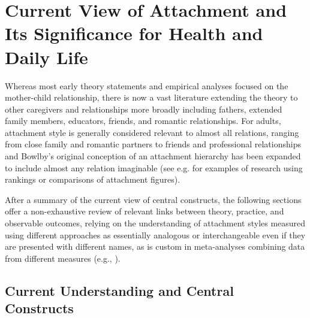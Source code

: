 \documentclass[12pt]{report}
\begin{document}
\section{Current View of Attachment and Its Significance for Health and Daily Life}
Whereas most early theory statements and empirical analyses focused on the mother-child relationship, there is now a vast literature extending the theory to other caregivers and relationships more broadly including fathers, extended family members, educators, friends, and romantic relationships. For adults, attachment style is generally considered relevant to almost all relations, ranging from close family and romantic partners to friends and professional relationships and Bowlby's original conception of an attachment hierarchy \cite{Bowlby1969attachment} has been expanded to include almost any relation imaginable (see e.g. \cite{Rosenthal2010, Karantzas2011ArthritisAS, Rowe2005, Tancredy2006} for examples of research using rankings or comparisons of attachment figures).

After a summary of the current view of central constructs, the following sections offer a non-exhaustive review of relevant links between theory, practice, and observable outcomes, relying on the understanding of attachment styles measured using different approaches as essentially analogous or interchangeable even if they are presented with different names, as is custom in meta-analyses combining data from different measures (e.g., \cite{McConnell2011,Pinquart2013}).

\subsection{Current Understanding and Central Constructs}
\end{document}
